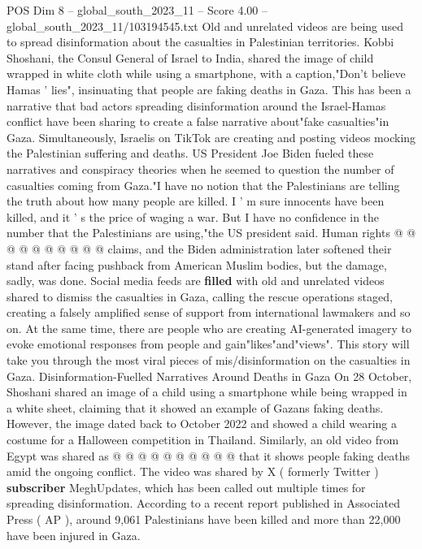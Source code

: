 \begin{textsample}{POS Dim 8 – global\_south\_2023\_11 – Score 4.00 – global\_south\_2023\_11/103194545.txt}  \label{ex:f8_pos_361}
Old and unrelated videos are being used to spread disinformation about the casualties in Palestinian territories.
Kobbi Shoshani, the Consul General of Israel to India, shared the image of child wrapped in white cloth while using a smartphone, with a caption,"Don't believe Hamas ' lies", insinuating that people are faking deaths in Gaza.
This has been a narrative that bad actors spreading disinformation around the Israel-Hamas conflict have been sharing to create a false narrative about"fake casualties"in Gaza.
Simultaneously, Israelis on TikTok are creating and posting videos mocking the Palestinian suffering and deaths.
US President Joe Biden fueled these narratives and conspiracy theories when he seemed to question the number of casualties coming from Gaza."I have no notion that the Palestinians are telling the truth about how many people are killed.
I ' m sure innocents have been killed, and it ' s the price of waging a war.
But I have no confidence in the number that the Palestinians are using,"the US president said.
Human rights @ @ @ @ @ @ @ @ @ @ claims, and the Biden administration later softened their stand after facing pushback from American Muslim bodies, but the damage, sadly, was done.
Social media feeds are \textbf{filled} with old and unrelated videos shared to dismiss the casualties in Gaza, calling the rescue operations staged, creating a falsely amplified sense of support from international lawmakers and so on.
At the same time, there are people who are creating AI-generated imagery to evoke emotional responses from people and gain"likes"and"views".
This story will take you through the most viral pieces of mis/disinformation on the casualties in Gaza.
Disinformation-Fuelled Narratives Around Deaths in Gaza On 28 October, Shoshani shared an image of a child using a smartphone while being wrapped in a white sheet, claiming that it showed an example of Gazans faking deaths.
However, the image dated back to October 2022 and showed a child wearing a costume for a Halloween competition in Thailand.
Similarly, an old video from Egypt was shared as @ @ @ @ @ @ @ @ @ @ that it shows people faking deaths amid the ongoing conflict.
The video was shared by X ( formerly Twitter ) \textbf{subscriber} MeghUpdates, which has been called out multiple times for spreading disinformation.
According to a recent report published in Associated Press ( AP ), around 9,061 Palestinians have been killed and more than 22,000 have been injured in Gaza.

\end{textsample}
